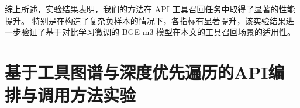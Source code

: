 综上所述，实验结果表明，我们的方法在 API 工具召回任务中取得了显著的性能提升。
特别是在构造了复杂负样本的情况下，各指标有显著提升，该实验结果进一步验证了基于对比学习微调的 BGE-m3 模型在本文的工具召回场景的适用性。

\section{基于工具图谱与深度优先遍历的API编排与调用方法实验}






